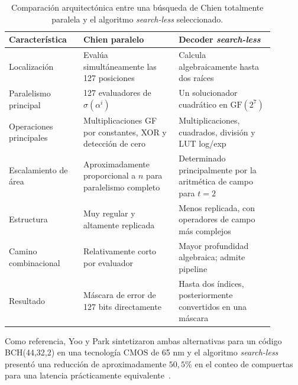 \documentclass[10pt,a4paper]{article}
\begin{document}
\begin{table}[H]
    \centering
    \begin{tabular}{@{}p{0.25\linewidth}p{0.32\linewidth}p{0.32\linewidth}@{}}
        \toprule
        \textbf{Característica} &
        \textbf{Chien paralelo} &
        \textbf{Decoder \textit{search-less}} \\
        \midrule

        Localización &
        Evalúa simultáneamente las 127 posiciones &
        Calcula algebraicamente hasta dos raíces \\

        Paralelismo principal &
        127 evaluadores de $\sigma(\alpha^i)$ &
        Un solucionador cuadrático en $\mathrm{GF}(2^7)$ \\

        Operaciones principales &
        Multiplicaciones GF por constantes, XOR y detección de cero &
        Multiplicaciones, cuadrados, división y LUT log/exp \\

        Escalamiento de área &
        Aproximadamente proporcional a $n$ para paralelismo completo &
        Determinado principalmente por la aritmética de campo para $t=2$ \\

        Estructura &
        Muy regular y altamente replicada &
        Menos replicada, con operadores de campo más complejos \\

        Camino combinacional &
        Relativamente corto por evaluador &
        Mayor profundidad algebraica; admite pipeline \\

        Resultado &
        Máscara de error de 127 bits directamente &
        Hasta dos índices, posteriormente convertidos en una máscara \\
        \bottomrule
    \end{tabular}

    \caption{Comparación arquitectónica entre una búsqueda de Chien totalmente
    paralela y el algoritmo \textit{search-less} seleccionado.}
    \label{tab:comparacion-decoders-bch}
\end{table}

Como referencia, Yoo y Park sintetizaron ambas alternativas para un código
BCH(44,32,2) en una tecnología CMOS de 65 nm y el algoritmo \textit{search-less}
presentó una reducción de aproximadamente $50{,}5\%$ en el conteo de compuertas
para una latencia prácticamente equivalente~\cite{yoo2014}.
\end{document}
